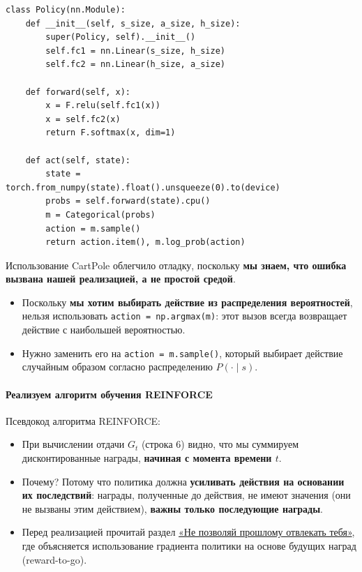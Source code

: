 \documentclass[11pt,a4paper]{article}
\begin{document}
\begin{lstlisting}
class Policy(nn.Module):
    def __init__(self, s_size, a_size, h_size):
        super(Policy, self).__init__()
        self.fc1 = nn.Linear(s_size, h_size)
        self.fc2 = nn.Linear(h_size, a_size)

    def forward(self, x):
        x = F.relu(self.fc1(x))
        x = self.fc2(x)
        return F.softmax(x, dim=1)

    def act(self, state):
        state = torch.from_numpy(state).float().unsqueeze(0).to(device)
        probs = self.forward(state).cpu()
        m = Categorical(probs)
        action = m.sample()
        return action.item(), m.log_prob(action)
\end{lstlisting}

Использование CartPole облегчило отладку, поскольку \textbf{мы знаем, что ошибка вызвана нашей реализацией, а не простой средой}.

\begin{itemize}
\item
  Поскольку \textbf{мы хотим выбирать действие из распределения вероятностей}, нельзя использовать \texttt{action\ =\ np.argmax(m)}: этот вызов всегда возвращает действие с наибольшей вероятностью.
\item
  Нужно заменить его на \texttt{action\ =\ m.sample()}, который выбирает действие случайным образом согласно распределению \(P(\cdot\mid s)\).
\end{itemize}

\paragraph{Реализуем алгоритм обучения REINFORCE}\label{lets-build-the-reinforce-training-algorithm}

Псевдокод алгоритма REINFORCE:


\begin{itemize}
\item
  При вычислении отдачи \(G_t\) (строка 6) видно, что мы суммируем дисконтированные награды, \textbf{начиная с момента времени \(t\)}.
\item
  Почему? Потому что политика должна \textbf{усиливать действия на основании их последствий}: награды, полученные до действия, не имеют значения (они не вызваны этим действием), \textbf{важны только последующие награды}.
\item
  Перед реализацией прочитай раздел \href{https://spinningup.openai.com/en/latest/spinningup/rl_intro3.html\#don-t-let-the-past-distract-you}{«Не позволяй прошлому отвлекать тебя»}, где объясняется использование градиента политики на основе будущих наград (reward-to-go).
\end{itemize}
\end{document}
